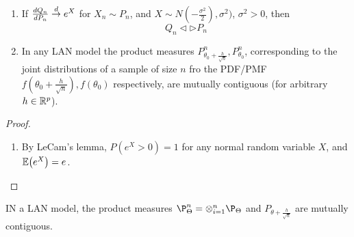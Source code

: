 \begin{corollary}
  \begin{enumerate}
  \item If $\frac{dQ_{n}}{dP_{n}} \overset{d}{\rightarrow} e^{X}$ for $X_{n} \sim P_{n}$,
        and $X \sim N(-\frac{\sigma^{2}}{2}), \sigma^{2})$, $\sigma^{2} > 0$, then
    \begin{equation}
      \label{eq:93}
      Q_{n} \lhd \rhd P_{n}
    \end{equation}
  \item In any LAN model the product measures $P_{\theta_{0} +
      \frac{h}{\sqrt{n}}}^{n}, P_{\theta_{0}}^{n}$, corresponding to
    the joint distributions of a sample of size $n$ fro the PDF/PMF
    $f(\theta_{0} + \frac{h}{\sqrt{n}}), f(\theta_{0})$ respectively,
    are mutually contiguous (for arbitrary $h \in \mathbb{R}^{p}$).
  \end{enumerate}
\end{corollary}


\begin{proof}
  \begin{enumerate}
  \item By LeCam's lemma, $P(e^{X} > 0) = 1$ for any normal random
    variable $X$, and $\E{e^{X}} = e^{}$.
  \end{enumerate}
\end{proof}


IN a LAN model, the product measures $\P^{n}_{\Theta} =
\otimes_{i=1}^{n} \P_{\Theta}$ and $P_{\theta + \frac{h}{\sqrt{n}}}$
are mutually contiguous.


